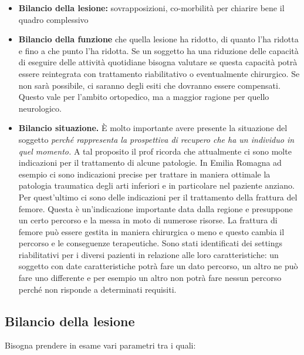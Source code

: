 \begin{itemize}
\item
  \textbf{Bilancio della lesione:} sovrapposizioni, co-morbilità per chiarire bene il quadro complessivo
\item
  \textbf{Bilancio della funzione} che quella lesione ha ridotto, di quanto l'ha ridotta e fino a che punto l'ha ridotta. Se un soggetto ha una riduzione delle capacità di eseguire delle attività quotidiane bisogna valutare se questa capacità potrà essere reintegrata con trattamento riabilitativo o eventualmente chirurgico. Se non sarà possibile, ci saranno degli esiti che dovranno essere compensati. Questo vale per l'ambito ortopedico, ma a maggior ragione per quello neurologico.
\item
  \textbf{Bilancio situazione.} È molto importante avere presente la situazione del soggetto \emph{perché rappresenta la prospettiva di recupero che ha un individuo in quel momento.} A tal proposito il prof ricorda che attualmente ci sono molte indicazioni per il trattamento di alcune patologie. In Emilia Romagna ad esempio ci sono indicazioni precise per trattare in maniera ottimale la patologia traumatica degli arti inferiori e in particolare nel paziente anziano. Per quest'ultimo ci sono delle indicazioni per il trattamento della frattura del femore. Questa è un'indicazione importante data dalla regione e presuppone un certo percorso e la messa in moto di numerose risorse. La frattura di femore può essere gestita in maniera chirurgica o meno e questo cambia il percorso e le conseguenze terapeutiche. Sono stati identificati dei settings riabilitativi per i diversi pazienti in relazione alle loro caratteristiche: un soggetto con date caratteristiche potrà fare un dato percorso, un altro ne può fare uno differente e per esempio un altro non potrà fare nessun percorso perché non risponde a determinati requisiti.
\end{itemize}

\subsection{Bilancio della lesione}

Bisogna prendere in esame vari parametri tra i quali:

